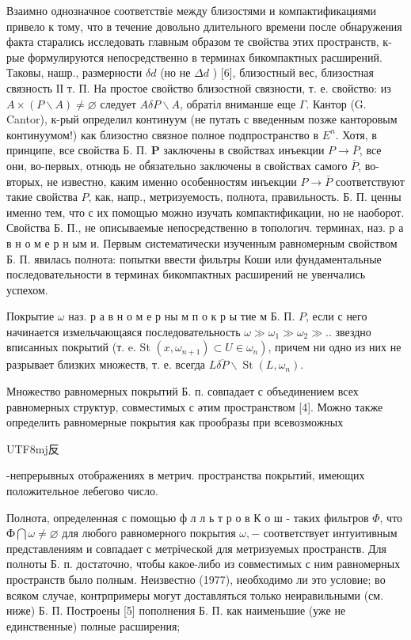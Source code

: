 \documentclass[10pt]{article}
\begin{document}
Взаимно однозначное соответствіе между близостями и компактификациями привело к тому, что в течение довольно длительного времени после обнаружения факта старались исследовать главным образом те свойства этих пространств, к-рые формулируются непосредственно в терминах бикомпактных расширений. Таковы, нашр., размерности $\delta d$ (но не $\Delta d$ ) [6], близостный вес, близостная связность ІІ т. П. На простое свойство близостной связности, т. е. свойство: из $A \times(P \backslash A) \neq \varnothing$ следует $A \delta P \backslash A$, обратіл вниманше еще $\Gamma$. Кантор (G. Cantor), к-рый определил континуум (не путать с введенным позже канторовым континуумом!) как близостно связное полное подпространство в $E^{n}$. Хотя, в принципе, все свойства Б. П. $\boldsymbol{P}$ заключены в свойствах инъекции $P \rightarrow \bar{P}$, все они, во-первых, отнюдь не об́язательно заключены в свойствах самого $\bar{P}$, во-вторых, не известно, каким именно особенностям инъекции $P \rightarrow \bar{P}$ соответствуют такие свойства $P$, как, напр., метризуемость, полнота, правильность. Б. П. ценны именно тем, что с их помощью можно изучать компактификации, но не наоборот. Свойства Б. П., не описываемые непосредственно в топологич. терминах, наз. р а в н о м е р н ым и. Первым систематически изученным равномерным свойством Б. П. явилась полнота: попытки ввести фильтры Коши или фундаментальные последовательности в терминах бикомпактных расширений не увенчались успехом.



Покрытие $\omega$ наз. р а в н о м е р ны м п о к р ы тие м Б. П. $P$, если с него начинается измельчающаяся последовательность $\omega \gg \omega_{1} \gg \omega_{2} \gg .$. звездно вписанных покрытий (т. e. St $\left.\left(x, \omega_{n+1}\right) \subset U \in \omega_{n}\right)$, причем ни одно из них не разрывает близких множеств, т. е. всегда $L \overline{\delta P} \backslash \operatorname{St}\left(L, \omega_{n}\right)$.



Множество равномерных покрытий Б. п. совпадает с объединением всех равномерных структур, совместимых с әтим пространством [4]. Можно также определить равномерные покрытия как прообразы при всевозможных \begin{CJK}{UTF8}{mj}反\end{CJK}-непрерывных отображениях в метрич. пространства покрытий, имеющих положительное лебегово число.



Полнота, определенная с помощью ф л л ь т р о в К о ш - таких фильтров $\Phi$, что $Ф \bigcap \omega \neq \varnothing$ для любого равномерного покрытия $\omega,-$ соответствует интуитивным представлениям и совпадает с метріческой для метризуемых пространств. Для полноты Б. п. достаточно, чтобы какое-либо из совместимых с ним равномерных пространств было полным. Неизвестно (1977), необходимо ли это условие; во всяком случае, контрпримеры могут доставляться только неиравильными (см. ниже) Б. П. Построены [5] пополнения Б. П. как наименьшие (уже не единственные) полные расширения;
\end{document}
